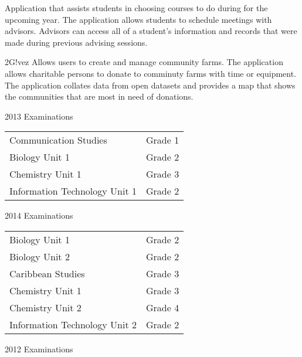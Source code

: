 \documentclass[10pt,a4paper]{altacv}
\begin{document}
\divider

Application that assists students in choosing courses to do during for the upcoming year. The application allows 
students to schedule meetings with advisors. Advisors can access all of a student's information and records that were made
during previous advising sessions. 

\divider

2G!vez Allows users to create and manage community farms. The application allows charitable persons to donate to comminuty farms with time or equipment. The application collates data from open datasets and provides a map that shows the communities that are most in need of donations.
\medskip

\clearpage





\divider

2013 Examinations

\medskip
\begin{tabular}{ l c }
Communication Studies & Grade 1\\
Biology Unit 1 & Grade 2\\
Chemistry Unit 1 & Grade 3\\
Information Technology Unit 1 & Grade 2
\end{tabular}
\medskip

2014 Examinations

\medskip
\begin{tabular}{ l c }
Biology Unit 1 &  Grade 2\\
Biology Unit 2 & Grade 2\\
Caribbean Studies & Grade 3\\
Chemistry Unit 1 & Grade 3\\
Chemistry Unit 2 & Grade 4\\
Information Technology Unit 2 & Grade 2 
\end{tabular}

\divider

2012 Examinations
\end{document}
